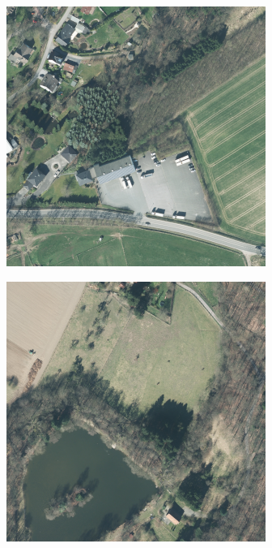 \begin{figure}
    \newcommand{\DopLabelImageWidth}{0.23\textwidth}
    \centering
    \hfill
    \begin{subfigure}{\DopLabelImageWidth}
        \includegraphics[width=\textwidth]{images/186_image}
    \end{subfigure}
    \hfill
    \begin{subfigure}{\DopLabelImageWidth}
        \includegraphics[width=\textwidth]{images/583_image}

\end{subfigure}
\end{figure}
